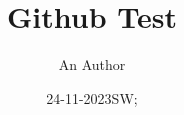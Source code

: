 \documentclass[11pt]{book}
\title{Github Test}
\author{An Author}
\date{24-11-2023SW;}
\begin{document}
\maketitle
\def\title#1{\chapter{#1}}
\tableofcontents

        
        
        
        
        
        
        
        
        
        
\end{document}
